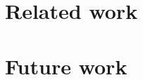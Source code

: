 \documentclass{llncs}
\begin{document}
\section{Related work}
\label{secRelatedWork}



\section{Future work}
\label{secFutureWork}






\end{document}
